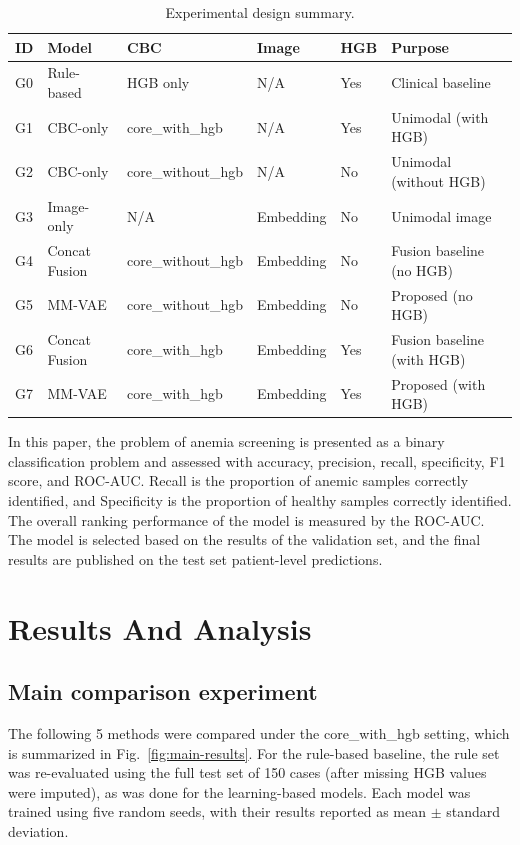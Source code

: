 \documentclass[conference]{IEEEtran}
\begin{document}
\begin{table}[t]
\caption{Experimental design summary.}
\label{tab:experiment-design}
\centering
\small
\begin{tabular}{p{}p{}p{}p{}p{}p{}}
\hline
\textbf{ID} & \textbf{Model} & \textbf{CBC} & \textbf{Image} & \textbf{HGB} & \textbf{Purpose} \\
\hline
G0 & Rule-based & HGB only & N/A & Yes & Clinical baseline \\
G1 & CBC-only & core\_with\_hgb & N/A & Yes & Unimodal (with HGB) \\
G2 & CBC-only & core\_without\_hgb & N/A & No & Unimodal (without HGB) \\
G3 & Image-only & N/A & Embedding & No & Unimodal image \\
G4 & Concat Fusion & core\_without\_hgb & Embedding & No & Fusion baseline (no HGB) \\
G5 & MM-VAE & core\_without\_hgb & Embedding & No & Proposed (no HGB) \\
G6 & Concat Fusion & core\_with\_hgb & Embedding & Yes & Fusion baseline (with HGB) \\
G7 & MM-VAE & core\_with\_hgb & Embedding & Yes & Proposed (with HGB) \\
\hline
\end{tabular}
\end{table}

In this paper, the problem of anemia screening is presented as a binary classification problem and assessed with accuracy, precision, recall, specificity, F1 score, and ROC-AUC. Recall is the proportion of anemic samples correctly identified, and Specificity is the proportion of healthy samples correctly identified. The overall ranking performance of the model is measured by the ROC-AUC. The model is selected based on the results of the validation set, and the final results are published on the test set patient-level predictions.

\section{Results And Analysis}

\subsection{Main comparison experiment}

The following 5 methods were compared under the core\_with\_hgb setting, which is summarized in Fig.~\ref{fig:main-results}. For the rule-based baseline, the rule set was re-evaluated using the full test set of 150 cases (after missing HGB values were imputed), as was done for the learning-based models. Each model was trained using five random seeds, with their results reported as mean $\pm$ standard deviation.
\end{document}
